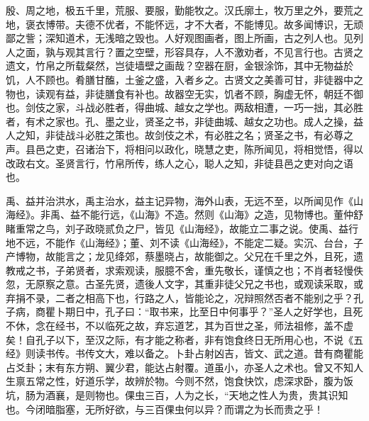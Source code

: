 \documentclass[]{article}
\begin{document}
殷、周之地，极五千里，荒服、要服，勤能牧之。汉氏廓土，牧万里之外，要荒之地，褒衣博带。夫德不优者，不能怀远，才不大者，不能博见。故多闻博识，无顽鄙之訾；深知道术，无浅暗之毁也。人好观图画者，图上所画，古之列人也。见列人之面，孰与观其言行？置之空壁，形容具存，人不激劝者，不见言行也。古贤之遗文，竹帛之所载粲然，岂徒墙壁之画哉？空器在厨，金银涂饰，其中无物益於饥，人不顾也。肴膳甘醢，土釜之盛，入者乡之。古贤文之美善可甘，非徒器中之物也，读观有益，非徒膳食有补也。故器空无实，饥者不顾，胸虚无怀，朝廷不御也。剑伎之家，斗战必胜者，得曲城、越女之学也。两敌相遭，一巧一拙，其必胜者，有术之家也。孔、墨之业，贤圣之书，非徒曲城、越女之功也。成人之操，益人之知，非徒战斗必胜之策也。故剑伎之术，有必胜之名；贤圣之书，有必尊之声。县邑之吏，召诸治下，将相问以政化，晓慧之吏，陈所闻见，将相觉悟，得以改政右文。圣贤言行，竹帛所传，练人之心，聪人之知，非徒县邑之吏对向之语也。

禹、益并治洪水，禹主治水，益主记异物，海外山表，无远不至，以所闻见作《山海经》。非禹、益不能行远，《山海》不造。然则《山海》之造，见物博也。董仲舒睹重常之鸟，刘子政晓贰负之尸，皆见《山海经》，故能立二事之说。使禹、益行地不远，不能作《山海经》；董、刘不读《山海经》，不能定二疑。实沉、台台，子产博物，故能言之；龙见绛郊，蔡墨晓占，故能御之。父兄在千里之外，且死，遗教戒之书，子弟贤者，求索观读，服臆不舍，重先敬长，谨慎之也；不肖者轻慢佚忽，无原察之意。古圣先贤，遗後人文字，其重非徒父兄之书也，或观读采取，或弃捐不录，二者之相高下也，行路之人，皆能论之，况辩照然否者不能别之乎？孔子病，商瞿卜期日中，孔子曰：``取书来，比至日中何事乎？''圣人之好学也，且死不休，念在经书，不以临死之故，弃忘道艺，其为百世之圣，师法祖修，盖不虚矣！自孔子以下，至汉之际，有才能之称者，非有饱食终日无所用心也，不说《五经》则读书传。书传文大，难以备之。卜卦占射凶吉，皆文、武之道。昔有商瞿能占爻卦；末有东方朔、翼少君，能达占射覆。道虽小，亦圣人之术也。曾又不知人生禀五常之性，好道乐学，故辨於物。今则不然，饱食快饮，虑深求卧，腹为饭坑，肠为酒襄，是则物也。倮虫三百，人为之长，``天地之性人为贵，贵其识知也。今闭暗脂塞，无所好欲，与三百倮虫何以异？而谓之为长而贵之乎！
\end{document}
